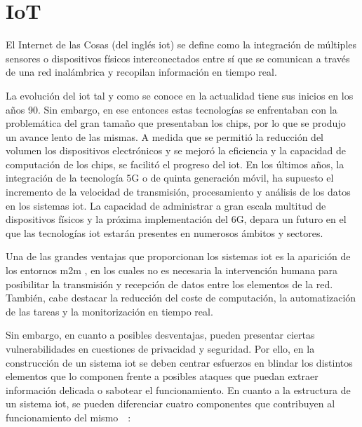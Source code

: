 \section{IoT}
\label{sec:iot}

El Internet de las Cosas (del inglés \acrfull{iot}) \cite{iot} \cite{iotamazon} se define como la integración de múltiples sensores o dispositivos físicos interconectados entre sí que se comunican a través de una red inalámbrica y recopilan información en tiempo real. 

\vspace{3mm}

La evolución del \gls{iot} tal y como se conoce en la actualidad tiene sus inicios en los años 90. Sin embargo, en ese entonces estas tecnologías se enfrentaban con la problemática del gran tamaño que presentaban los chips, por lo que se produjo un avance lento de las mismas. A medida que se permitió la reducción del volumen los dispositivos electrónicos y se mejoró la eficiencia y la capacidad de computación de los chips, se facilitó el progreso del \gls{iot}. En los últimos años, la integración de la tecnología 5G o de quinta generación móvil, ha supuesto el incremento de la velocidad de transmisión, procesamiento y análisis de los datos en los sistemas \gls{iot}. La capacidad de administrar a gran escala multitud de dispositivos físicos y la próxima implementación del 6G, depara un futuro en el que las tecnologías \gls{iot} estarán presentes en numerosos ámbitos y sectores.

\vspace{3mm}

Una de las grandes ventajas que proporcionan los sistemas \gls{iot} es la aparición de los entornos \gls{m2m} \cite{m2m}, en los cuales no es necesaria la intervención humana para posibilitar la transmisión y recepción de datos entre los elementos de la red. También, cabe destacar la reducción del coste de computación, la automatización de las tareas y la monitorización en tiempo real. 

\vspace{3mm}

Sin embargo, en cuanto a posibles desventajas, pueden presentar ciertas vulnerabilidades en cuestiones de privacidad y seguridad. Por ello, en la construcción de un sistema \gls{iot} se deben centrar esfuerzos en blindar los distintos elementos que lo componen frente a posibles ataques que puedan extraer información delicada o sabotear el funcionamiento. En cuanto a la estructura de un sistema \gls{iot}, se pueden diferenciar cuatro componentes que contribuyen al funcionamiento del mismo~\cite{iot}~\cite{iotamazon}:

